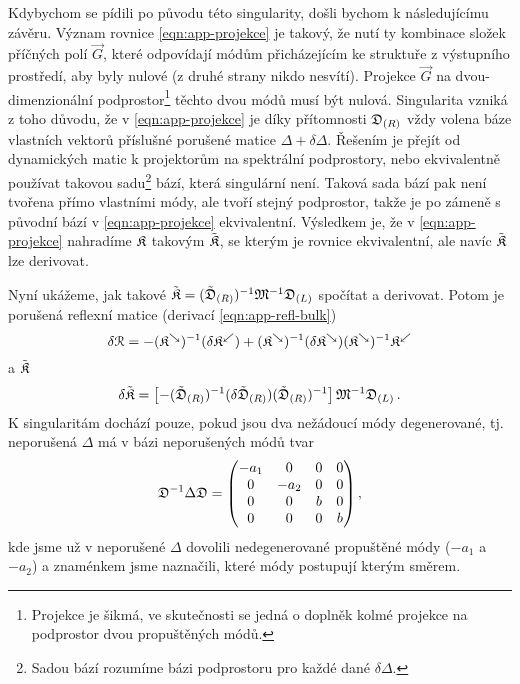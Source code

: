 Kdybychom se pídili po původu této singularity, došli bychom k následujícímu závěru.
Význam rovnice \eqref{eqn:app-projekce} je takový, že nutí ty kombinace složek příčných polí $\vec{G}$, které odpovídají módům přicházejícím ke struktuře z výstupního prostředí, aby byly nulové (z druhé strany nikdo nesvítí).
Projekce $\vec{G}$ na dvou-dimenzionální podprostor\footnote{Projekce je šikmá, ve skutečnosti se jedná o doplněk kolmé projekce na podprostor dvou propuštěných módů.} těchto dvou módů musí být nulová.
Singularita vzniká z toho důvodu, že v \eqref{eqn:app-projekce} je díky přítomnosti $\mathfrak{D}_{(R)}$ vždy volena báze vlastních vektorů příslušné porušené matice $\Delta+\delta\Delta$.
Řešením je přejít od dynamických matic k projektorům na spektrální podprostory, nebo ekvivalentně používat takovou sadu\footnote{Sadou bází rozumíme bázi podprostoru pro každé dané $\delta\Delta$.} bází, která singulární není.
Taková sada bází pak není tvořena přímo vlastními módy, ale tvoří stejný podprostor, takže je po zámeně s původní bází v \eqref{eqn:app-projekce} ekvivalentní.
Výsledkem je, že v \eqref{eqn:app-projekce} nahradíme $\mathfrak{K}$ takovým $\tilde{\mathfrak{K}}$, se kterým je rovnice ekvivalentní, ale navíc $\tilde{\mathfrak{K}}$ lze derivovat.

Nyní ukážeme, jak takové $\tilde{\mathfrak{K}}=(\tilde{\mathfrak{D}}_{(R)})^{-1}\mathfrak{M}^{-1}\mathfrak{D}_{(L)}$ spočítat a derivovat.
Potom je porušená reflexní matice (derivací \eqref{eqn:app-refl-bulk})
\begin{equation}
    \label{eqn:app-dR-bulk}
    \delta\mathcal{R} = -(\mathfrak{K}^\searrow)^{-1} (\delta\mathfrak{K}^\swarrow) + (\mathfrak{K}^\searrow)^{-1} (\delta\mathfrak{K}^\searrow)(\mathfrak{K}^\searrow)^{-1}\mathfrak{K}^\swarrow
\end{equation}
a $\tilde{\mathfrak{K}}$
\begin{equation}
    \delta\tilde{\mathfrak{K}} = \left[-(\tilde{\mathfrak{D}}_{(R)})^{-1} (\delta\tilde{\mathfrak{D}}_{(R)}) (\tilde{\mathfrak{D}}_{(R)})^{-1} \right]\mathfrak{M}^{-1}\mathfrak{D}_{(L)} \,.
\end{equation}
K singularitám dochází pouze, pokud jsou dva nežádoucí módy degenerované, tj. neporušená $\Delta$ má v bázi neporušených módů tvar
\begin{equation}
    \mathfrak{D}^{-1}\Delta\mathfrak{D} = \begin{pmatrix} 
        -a_1&0&0&0\\0&-a_2&0&0\\
        0&0&b&0\\0&0&0&b
    \end{pmatrix},
\end{equation}
kde jsme už v neporušené $\Delta$ dovolili nedegenerované propuštěné módy ($-a_1$ a $-a_2$) a znaménkem jsme naznačili, které módy postupují kterým směrem.



